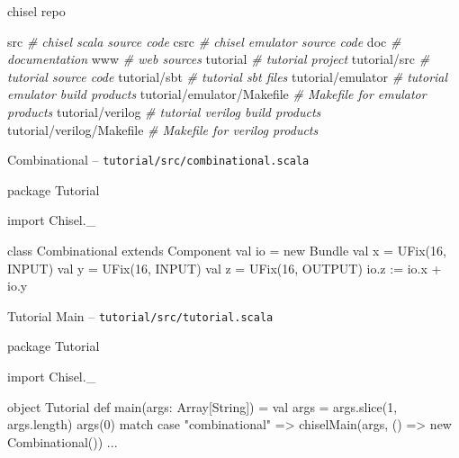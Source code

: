 \documentclass[xcolor=pdflatex,dvipsnames,table]{beamer}
\newenvironment{FramedSemiVerb}%
{\begin{Sbox}\begin{minipage}{.94\textwidth}\begin{semiverbatim}}%
{\end{semiverbatim}\end{minipage}\end{Sbox}
\setlength{\fboxsep}{8pt}\fbox{\TheSbox}}
\newcommand{\comment}[1]{{\color{Green}\it\smaller #1}}
\begin{document}
\begin{frame}[fragile]{chisel repo}
\begin{FramedSemiVerb}
src                        \comment{\# chisel scala source code}
csrc                       \comment{\# chisel emulator source code}
doc                        \comment{\# documentation}
www                        \comment{\# web sources}
tutorial                   \comment{\# tutorial project}
tutorial/src               \comment{\# tutorial source code}
tutorial/sbt               \comment{\# tutorial sbt files}
tutorial/emulator          \comment{\# tutorial emulator build products}
tutorial/emulator/Makefile \comment{\# Makefile for emulator products} 
tutorial/verilog           \comment{\# tutorial verilog build products} 
tutorial/verilog/Makefile  \comment{\# Makefile for verilog products} 
\end{FramedSemiVerb}
\end{frame}

\begin{frame}[fragile]{Combinational -- \tt\small tutorial/src/combinational.scala}
\begin{scala}
package Tutorial

import Chisel._

class Combinational extends Component {
  val io = new Bundle {
    val x = UFix(16, INPUT)
    val y = UFix(16, INPUT)
    val z = UFix(16, OUTPUT)
  }
  io.z := io.x + io.y
}
\end{scala}
\end{frame}

\begin{frame}[fragile]{Tutorial Main -- \tt tutorial/src/tutorial.scala}

\begin{scala}
package Tutorial

import Chisel._

object Tutorial {
  def main(args: Array[String]) = {
    val args = args.slice(1, args.length)
    args(0) match {
      case "combinational" => 
        chiselMain(args, () => new Combinational())
      ...
    }
  }
}
\end{scala}
\end{frame}
\end{document}
